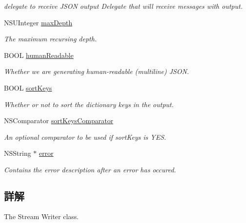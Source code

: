 \begin{DoxyCompactItemize}
\begin{DoxyCompactList}\small\item\em delegate to receive J\+S\+O\+N output Delegate that will receive messages with output. \end{DoxyCompactList}\item 
N\+S\+U\+Integer \hyperlink{interface_s_b_json_stream_writer_a146e7e950ab74a0e766ffd860e454fc9}{max\+Depth}
\begin{DoxyCompactList}\small\item\em The maximum recursing depth. \end{DoxyCompactList}\item 
B\+O\+O\+L \hyperlink{interface_s_b_json_stream_writer_af43e8bd7170d6128480515f532b7b791}{human\+Readable}
\begin{DoxyCompactList}\small\item\em Whether we are generating human-\/readable (multiline) J\+S\+O\+N. \end{DoxyCompactList}\item 
B\+O\+O\+L \hyperlink{interface_s_b_json_stream_writer_ab206c6844a0fd20307b5dfe881e17bf2}{sort\+Keys}
\begin{DoxyCompactList}\small\item\em Whether or not to sort the dictionary keys in the output. \end{DoxyCompactList}\item 
N\+S\+Comparator \hyperlink{interface_s_b_json_stream_writer_a4a23ef91623a82c08a1597937b7c4f3b}{sort\+Keys\+Comparator}
\begin{DoxyCompactList}\small\item\em An optional comparator to be used if sort\+Keys is Y\+E\+S. \end{DoxyCompactList}\item 
\hypertarget{interface_s_b_json_stream_writer_a7b4739905d4f23e82e5efd14b8acabea}{}N\+S\+String $\ast$ \hyperlink{interface_s_b_json_stream_writer_a7b4739905d4f23e82e5efd14b8acabea}{error}\label{interface_s_b_json_stream_writer_a7b4739905d4f23e82e5efd14b8acabea}

\begin{DoxyCompactList}\small\item\em Contains the error description after an error has occured. \end{DoxyCompactList}\end{DoxyCompactItemize}


\subsection{詳解}
The Stream Writer class. 

